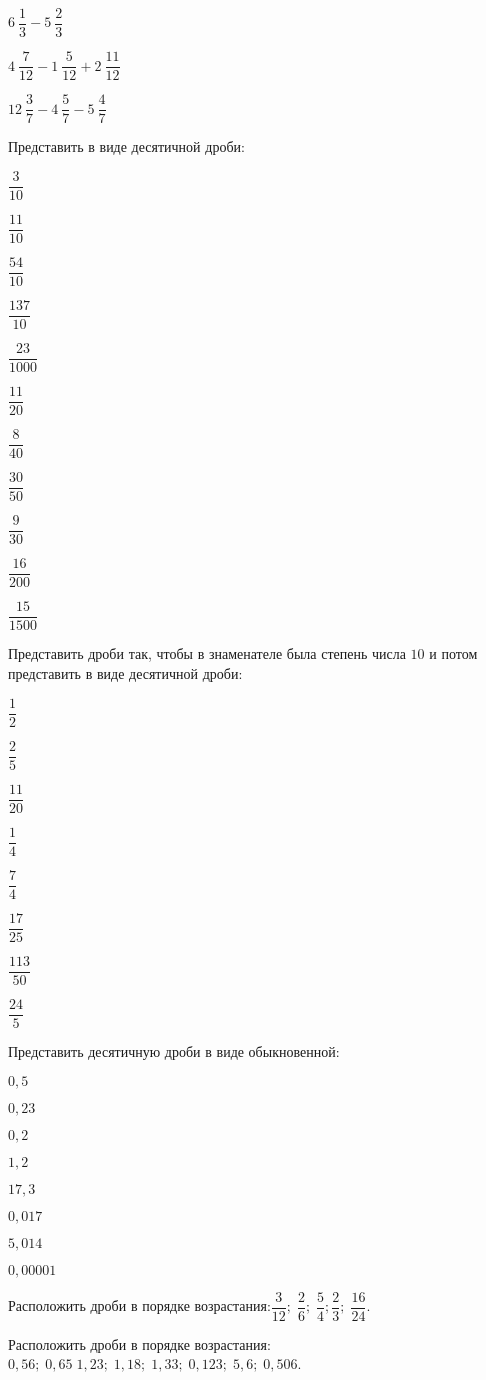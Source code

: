 \begin{listofex}
\begin{enumcols}[itemcolumns=3]
		\item \( 6\:\dfrac{1}{3}-5\:\dfrac{2}{3} \)
		\item \( 4\:\dfrac{7}{12}-1\:\dfrac{5}{12}+2\:\dfrac{11}{12} \)
		\item \( 12\:\dfrac{3}{7}-4\:\dfrac{5}{7}-5\:\dfrac{4}{7} \)
	\end{enumcols}
	\item Представить в виде десятичной дроби:
	\begin{enumcols}[itemcolumns=4]
		\item \( \dfrac{3}{10} \)
		\item \( \dfrac{11}{10} \)
		\item \( \dfrac{54}{10} \)
		\item \( \dfrac{137}{10} \)
		\item \( \dfrac{23}{1000} \)
		\item \( \dfrac{11}{20} \)
		\item \( \dfrac{8}{40} \)
		\item \( \dfrac{30}{50} \)
		\item \( \dfrac{9}{30} \)
		\item \( \dfrac{16}{200} \)
		\item \( \dfrac{15}{1500} \)
	\end{enumcols}
	\item Представить дроби так, чтобы в знаменателе была степень числа \( 10 \) и потом представить в виде десятичной дроби:
	\begin{enumcols}[itemcolumns=8]
		\item \( \dfrac{1}{2} \)
		\item \( \dfrac{2}{5} \)
		\item \( \dfrac{11}{20} \)
		\item \( \dfrac{1}{4} \)
		\item \( \dfrac{7}{4} \)
		\item \( \dfrac{17}{25} \)
		\item \( \dfrac{113}{50} \)
		\item \( \dfrac{24}{5} \)
	\end{enumcols}
	\item Представить десятичную дроби в виде обыкновенной:
	\begin{enumcols}[itemcolumns=4]
		\item \( 0,5 \)
		\item \( 0,23 \)
		\item \( 0,2 \)
		\item \( 1,2 \)
		\item \( 17,3 \)
		\item \( 0,017 \)
		\item \( 5,014 \)
		\item \( 0,00001 \)
	\end{enumcols}
	\item Расположить дроби в порядке возрастания:\( \dfrac{3}{12};\;\dfrac{2}{6};\;\dfrac{5}{4};\dfrac{2}{3};\;\dfrac{16}{24} \).
	\item Расположить дроби в порядке возрастания:\( 0,56;\;0,65\;1,23;\;1,18;\;1,33;\;0,123;\;5,6;\;0,506 \).
\end{listofex}
%
%
